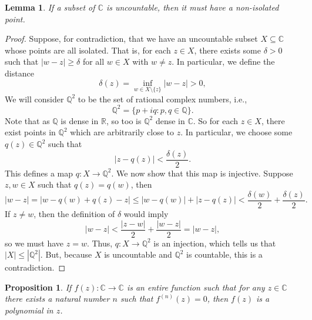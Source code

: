 \documentclass[12pt]{article}
\newtheorem{proposition}{Proposition}
\newtheorem{lemma}{Lemma}
\newcommand{\R}{\mathbb{R}}
\newcommand{\C}{\mathbb{C}}
\newcommand{\Q}{\mathbb{Q}}
\begin{document}
\begin{lemma}
    If a subset of $\C$ is uncountable, then it must have a non-isolated point.
\end{lemma}

\begin{proof}
    Suppose, for contradiction, that we have an uncountable subset $X \subseteq \C$ whose points are all isolated. That is, for each $z \in X$, there exists some $\delta > 0$ such that $|w - z| \geq \delta$ for all $w \in X$ with $w \ne z$. In particular, we define the distance
    \[
        \delta(z) = \inf_{w \in X \setminus \{z\}} |w - z| > 0,
    \]
    We will consider $\Q^2$ to be the set of rational complex numbers, i.e.,
    \[
        \Q^2 = \{p + iq : p, q \in \Q\}.
    \]
    Note that as $\Q$ is dense in $\R$, so too is $\Q^2$ dense in $\C$. So for each $z \in X$, there exist points in $\Q^2$ which are arbitrarily close to $z$. In particular, we choose some $q(z) \in \Q^2$ such that
    \[
        |z - q(z)| < \frac{\delta(z)}{2}.
    \]
    This defines a map $q : X \to \Q^2$. We now show that this map is injective. Suppose $z, w \in X$ such that $q(z) = q(w)$, then
    \[
        |w - z| = |w - q(w) + q(z) - z| \leq |w - q(w)| + |z - q(z)| < \frac{\delta(w)}{2} + \frac{\delta(z)}{2}.
    \]
    If $z \ne w$, then the definition of $\delta$ would imply
    \[
        |w - z| < \frac{|z - w|}{2} + \frac{|w - z|}{2} = |w - z|,
    \]
    so we must have $z = w$. Thus, $q : X \to \Q^2$ is an injection, which tells us that $|X| \leq |\Q^2|$. But, because $X$ is uncountable and $\Q^2$ is countable, this is a contradiction. 
    
\end{proof}

\newpage
\begin{proposition}
    If $f(z) : \C \to \C$ is an entire function such that for any $z \in \C$ there exists a natural number $n$ such that $f^{(n)}(z) = 0$, then $f(z)$ is a polynomial in $z$.
\end{proposition}
\end{document}

